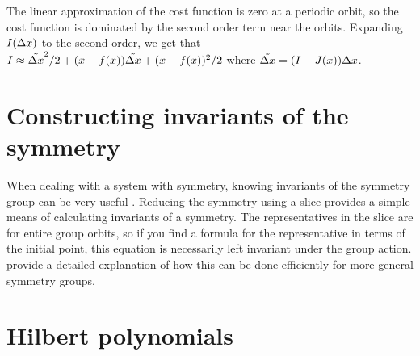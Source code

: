 {The linear approximation of the cost function is zero at a
periodic orbit, so the cost function is dominated by the
second order term near the orbits. Expanding $I(\Delta x)$
to the second order, we get that $I \approx \tilde{\Delta
x}^2/2 + (x - f(x)) \tilde{\Delta x} +
(x-f(x))^2/2$ where $\tilde{\Delta x} =
(I-J(x))\Delta x$.
    \fi %

\section{Constructing invariants of the symmetry}

When dealing with a system with symmetry, knowing invariants of the symmetry group can be very useful . Reducing the symmetry using a slice provides a simple means of calculating invariants of a symmetry. The representatives in the slice are for entire group orbits, so if you find a formula for the representative in terms of the initial point, this equation is necessarily left invariant under the group action.
 provide a detailed explanation of how this can be done efficiently for more general symmetry groups.



	\ifarticle
	\else

\section{Hilbert polynomials}
\label{SF:relStab}

}
